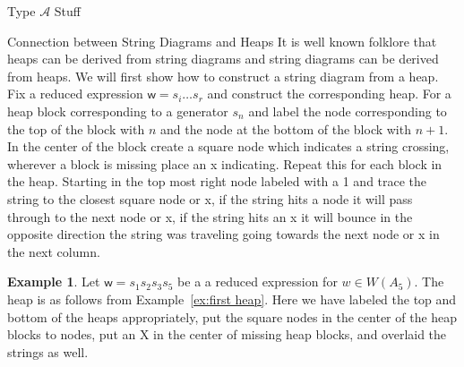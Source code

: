 \documentclass[11pt]{amsart}
\theoremstyle{definition}
\newtheorem{example}[theorem]{Example}
\numberwithin{equation}{section}
\newcommand{\A}{\mathcal{A}}
\renewcommand{\(}{\left(}
\renewcommand{\)}{\right)}
\newcommand{\w}{\mathsf{w}}
\newcommand\xxaxis{0}
\newcommand\yyaxis{90}
\newcommand\nsq[3]{\fill[fill=cyan!30, draw=black, rounded corners, line width=1pt, shift={(\xxaxis:#1)},shift={(\yyaxis:#2)}] (0,0) -- (2,0) -- (2,-2) -- (0,-2) --cycle;\node at (#1+1,#2-1) {$#3$};}
\begin{document}
\begin{section}{Type $\A$ Stuff}
\begin{subsection}{Connection between String Diagrams and Heaps}
It is well known folklore that heaps can be derived from string diagrams and string diagrams can be derived from heaps. We will first show how to construct a string diagram from a heap. Fix a reduced expression $\w=s_i\ldots s_r$ and construct the corresponding heap. For a heap block corresponding to a generator $s_n$ and label the node corresponding to the top of the block with $n$ and the node at the bottom of the block with $n+1$. In the center of the block create a square node which indicates a string crossing, wherever a block is missing place an x indicating. Repeat this for each block in the heap. Starting in the top most right node labeled with a 1 and trace the string to the closest square node or x, if the string hits a node it will pass through to the next node or x, if the string hits an x it will bounce in the opposite direction the string was traveling going towards the next node or x in the next column.
\begin{example}\label{ex:string to heap}
Let $\w=s_1 s_2 s_3 s_5$ be a a reduced expression for $w \in W(A_5)$. The heap is as follows from Example~\ref{ex:first heap}. Here we have labeled the top and bottom of the heaps appropriately, put the square nodes in the center of the heap blocks to nodes, put an X in the center of missing heap blocks, and overlaid the strings as well. 
\begin{center} 
\end{center}
\end{example}
\end{subsection}
\end{section}
\end{document}
